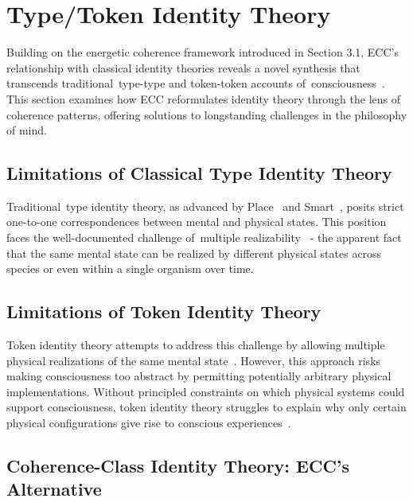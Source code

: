 \section{Type/Token Identity Theory}

Building on the energetic coherence framework introduced in Section 3.1, ECC's relationship with classical identity theories reveals a novel synthesis that transcends traditional~type-type and token-token accounts of~consciousness~\cite{polger2009evaluating,armstrong2002materialist}. This section examines how ECC reformulates identity theory through the lens of coherence patterns, offering solutions to longstanding challenges in the philosophy of mind.

\subsection*{Limitations of Classical Type Identity Theory}

Traditional~type identity theory, as advanced by Place~\cite{place1956is} and Smart~\cite{smart1959sensations}, posits strict one-to-one correspondences between mental and physical states. This position faces the well-documented challenge of~multiple realizability~\cite{lewis1966argument,putnam1967psychological} - the apparent fact that the same mental state can be realized by different physical states across species or even within a single organism over time.

\subsection*{Limitations of Token Identity Theory}

Token identity theory attempts to address this challenge by allowing multiple physical realizations of the same mental state~\cite{bechtel1999multiple}. However, this approach risks making consciousness too abstract by permitting potentially arbitrary physical implementations. Without principled constraints on which physical systems could support consciousness, token identity theory struggles to explain why only certain physical configurations give rise to conscious experiences~\cite{shapiro2000multiple,gillett2016reduction}.

\subsection*{Coherence-Class Identity Theory: ECC's Alternative}

